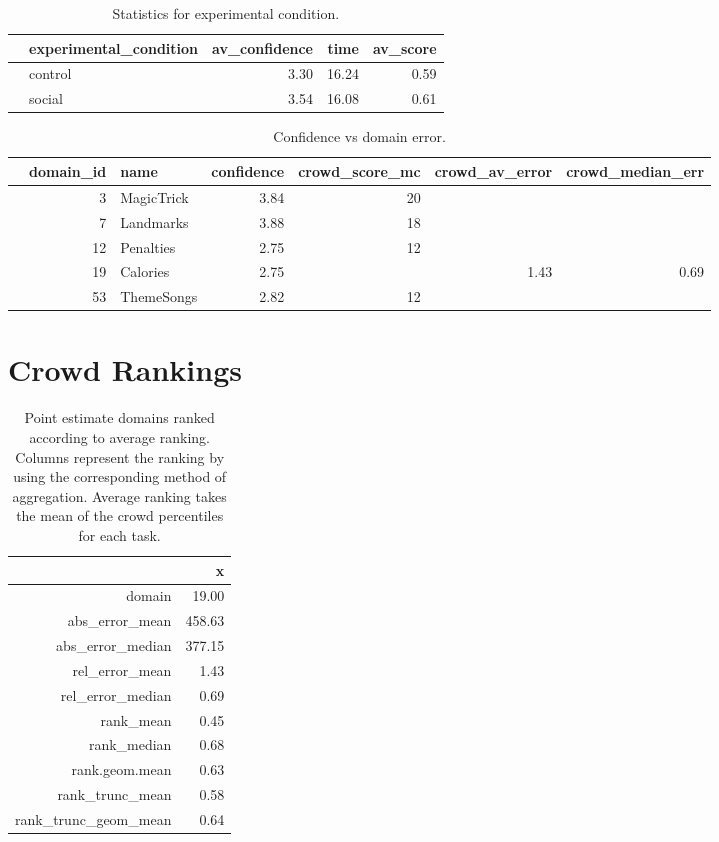 \documentclass[12pt]{article}
\begin{document}
\begin{table}[ht]
\centering
\begin{tabular}{rlrrr}
  \hline
 & experimental\_condition & av\_confidence & time & av\_score \\ 
  \hline
  & control & 3.30 & 16.24 & 0.59 \\ 
  & social & 3.54 & 16.08 & 0.61 \\  
   \hline
\end{tabular}
\caption{Statistics for experimental condition.} 
\end{table}

\begin{table}[ht]
\centering
\begin{tabular}{rrlrrrr}
  \hline
 & domain\_id & name & confidence & crowd\_score\_mc & crowd\_av\_error & crowd\_median\_err \\ 
  \hline
 &   3 & MagicTrick & 3.84 &  20 &  &  \\ 
 &   7 & Landmarks & 3.88 &  18 &  &  \\ 
 &  12 & Penalties & 2.75 &  12 &  &  \\ 
 &  19 & Calories & 2.75 &   & 1.43 & 0.69 \\ 
 &  53 & ThemeSongs & 2.82 &   12 &  &  \\ 
   \hline
\end{tabular}
\caption{Confidence vs domain error.} 
\end{table}

\clearpage

\section{Crowd Rankings}



\begin{table}[ht]
\centering
\begin{tabular}{rr}
  \hline
 & x \\ 
  \hline
domain & 19.00 \\ 
  abs\_error\_mean & 458.63 \\ 
  abs\_error\_median & 377.15 \\ 
  rel\_error\_mean & 1.43 \\ 
  rel\_error\_median & 0.69 \\ 
  rank\_mean & 0.45 \\ 
  rank\_median & 0.68 \\ 
  rank.geom.mean & 0.63 \\ 
  rank\_trunc\_mean & 0.58 \\ 
  rank\_trunc\_geom\_mean & 0.64 \\ 
   \hline
\end{tabular}
\caption{Point estimate domains ranked according to average ranking. Columns represent 
       the ranking by using the corresponding method of aggregation. Average ranking takes the 
       mean of the crowd percentiles for each task.} 
\end{table}
\end{document}
